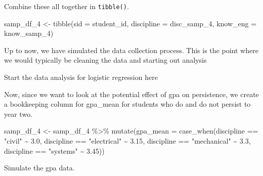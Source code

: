 \documentclass[
]{book}
\newenvironment{Shaded}{\begin{snugshade}}{\end{snugshade}}
\newcommand{\AttributeTok}[1]{\textcolor[rgb]{0.77,0.63,0.00}{#1}}
\newcommand{\DecValTok}[1]{\textcolor[rgb]{0.00,0.00,0.81}{#1}}
\newcommand{\FloatTok}[1]{\textcolor[rgb]{0.00,0.00,0.81}{#1}}
\newcommand{\FunctionTok}[1]{\textcolor[rgb]{0.00,0.00,0.00}{#1}}
\newcommand{\NormalTok}[1]{#1}
\newcommand{\OtherTok}[1]{\textcolor[rgb]{0.56,0.35,0.01}{#1}}
\newcommand{\SpecialCharTok}[1]{\textcolor[rgb]{0.00,0.00,0.00}{#1}}
\newcommand{\StringTok}[1]{\textcolor[rgb]{0.31,0.60,0.02}{#1}}
\begin{document}
Combine these all together in \texttt{tibble()}.

\begin{Shaded}
\begin{Highlighting}[]
\NormalTok{samp\_df\_4 }\OtherTok{\textless{}{-}} \FunctionTok{tibble}\NormalTok{(}\AttributeTok{sid =}\NormalTok{ student\_id,}
                    \AttributeTok{discipline =}\NormalTok{ disc\_samp\_4,}
                    \AttributeTok{know\_eng =}\NormalTok{ know\_samp\_4)}
\end{Highlighting}
\end{Shaded}

Up to now, we have simulated the data collection process. This is the point where we would typically be cleaning the data and starting out analysis

Start the data analysis for logistic regression here

Now, since we want to look at the potential effect of gpa on persistence, we create a bookkeeping column for gpa\_mean for students who do and do not persist to year two.

\begin{Shaded}
\begin{Highlighting}[]
\NormalTok{samp\_df\_4 }\OtherTok{\textless{}{-}}\NormalTok{ samp\_df\_4 }\SpecialCharTok{\%\textgreater{}\%} 
  \FunctionTok{mutate}\NormalTok{(}\AttributeTok{gpa\_mean =} \FunctionTok{case\_when}\NormalTok{(discipline }\SpecialCharTok{==} \StringTok{"civil"} \SpecialCharTok{\textasciitilde{}} \FloatTok{3.0}\NormalTok{,}
\NormalTok{                              discipline }\SpecialCharTok{==} \StringTok{"electrical"} \SpecialCharTok{\textasciitilde{}} \FloatTok{3.15}\NormalTok{,}
\NormalTok{                              discipline }\SpecialCharTok{==} \StringTok{"mechanical"} \SpecialCharTok{\textasciitilde{}} \FloatTok{3.3}\NormalTok{,}
\NormalTok{                              discipline }\SpecialCharTok{==} \StringTok{"systems"} \SpecialCharTok{\textasciitilde{}} \FloatTok{3.45}\NormalTok{))}
\end{Highlighting}
\end{Shaded}

Simulate the gpa data.

\begin{Shaded}
\end{Shaded}
\end{document}
